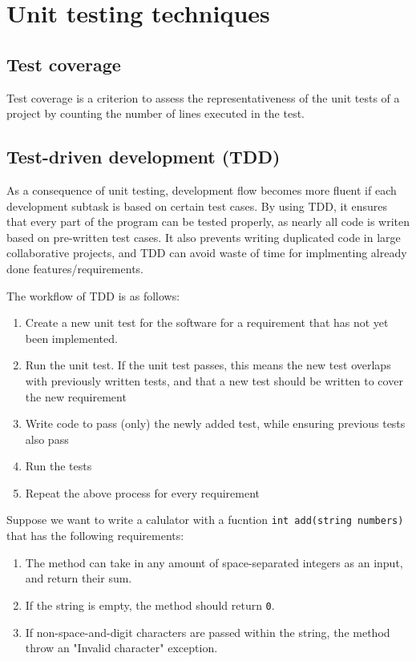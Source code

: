 \usepackage{hyperref}

\section{Unit testing techniques}
\subsection{Test coverage}
Test coverage is a criterion to assess the representativeness of the unit tests of a project by counting the number of lines executed in the test.


\subsection{Test-driven development (TDD)}
As a consequence of unit testing, development flow becomes more fluent if each development subtask is based on certain test cases. By using TDD, it ensures that every part of the program can be tested properly, as nearly all code is writen based on pre-written test cases. It also prevents writing duplicated code in large collaborative projects, and TDD can avoid waste of time for implmenting already done features/requirements. 

The workflow of TDD is as follows:

\begin{enumerate}
	\item Create a new unit test for the software for a requirement that has not yet been implemented. 
	\item Run the unit test. If the unit test passes, this means the new test overlaps with previously written tests, and that a new test should be written to cover the new requirement
	\item Write code to pass (only) the newly added test, while ensuring previous tests also pass
	\item Run the tests
	\item Repeat the above process for every requirement
\end{enumerate}

Suppose we want to write a calulator with a fucntion \texttt{int add(string numbers)} that has the following requirements:

\begin{enumerate}
	\item The method can take in any amount of space-separated integers as an input, and return their sum.
	\item If the string is empty, the method should return \texttt{0}.
	\item If non-space-and-digit characters are passed within the string, the method throw an "Invalid character" exception. 
\end{enumerate}

